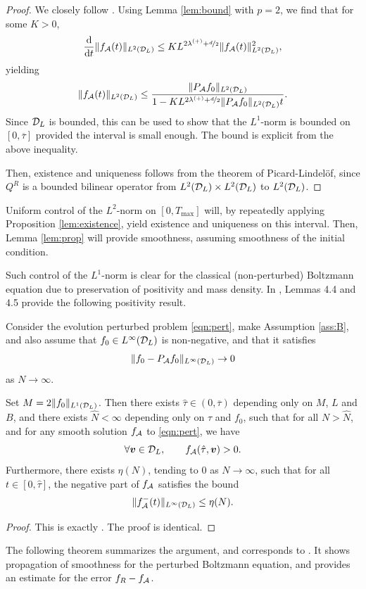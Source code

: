 \begin{proof}
  We closely follow \cite[Proposition 4.3]{Filbet11}. Using Lemma
  \ref{lem:bound} with $p=2$, we find that for some $K>0$,
  $$
  \frac{\mathrm{d}}{\mathrm{d} t}\|f_{\mathcal{A}}(t)\|_{L^2(\mathcal{D}_L)} \le
  KL^{2\lambda^{(+)}+\nicefrac{d}{2}}\|f_{\mathcal{A}}(t)\|_{L^2(\mathcal{D}_L)}^2,
  $$
  yielding
  $$
  \|f_{\mathcal{A}}(t)\|_{L^2(\mathcal{D}_L)} \leq \frac{\|P_{\mathcal{A}} f_0\|_{L^2(\mathcal{D}_L)}}
  {1-KL^{2\lambda^{(+)}+\nicefrac{d}{2}}\|P_{\mathcal{A}} f_0\|_{L^2(\mathcal{D}_L)}t}.
  $$
  Since $\mathcal{D}_L$ is bounded, this can be used to show that the $L^1$-norm is
  bounded on $[0,\overline{\tau}]$ provided the interval is small enough. The
  bound is explicit from the above inequality.
  
  Then, existence and uniqueness follows from the theorem of Picard-Lindelöf,
  since $Q^R$ is a bounded bilinear operator from $L^2(\mathcal{D}_L)\times L^2(\mathcal{D}_L)$ to
  $L^2(\mathcal{D}_L)$.
\end{proof}

Uniform control of the $L^2$-norm on $[0,T_\mathrm{max}]$ will, by repeatedly
applying Proposition \ref{lem:existence}, yield existence and uniqueness on
this interval. Then, Lemma \ref{lem:prop} will provide smoothness, assuming
smoothness of the initial condition.

Such control of the $L^1$-norm is clear for the classical (non-perturbed)
Boltzmann equation due to preservation of positivity and mass density. In
\cite{Filbet11}, Lemmas 4.4 and 4.5 provide the following positivity result.
\begin{lemma} \label{lem:positivity}
    Consider the evolution perturbed problem \eqref{eqn:pert}, make Assumption \ref{ass:B},
    and also assume that $f_0\in L^\infty(\mathcal{D}_L)$ is non-negative, and that it
    satisfies
    $$
        \|f_0-P_{\mathcal{A}} f_0\|_{L^\infty(\mathcal{D}_L)} \to 0
    $$
    as $N\to\infty$.

    Set $M=2\|f_0\|_{L^1(\mathcal{D}_L)}$. Then there exists $\hat{\tau} \in
    (0,\overline{\tau})$ depending only on $M$, $L$ and $B$, and there exists
    $\hat{N}<\infty$ depending only on $\hat{\tau}$ and $f_0$, such that for
    all $N > \hat{N}$, and for any smooth solution $f_{\mathcal{A}}$ to \eqref{eqn:pert},
    we have
    $$
        \forall {\bm v}\in\mathcal{D}_L, \qquad f_{\mathcal{A}}(\hat{\tau},{\bm v}) > 0.
    $$
    Furthermore, there exists $\eta(N)$, tending to $0$ as $N\to\infty$, such
    that for all $t\in[0,\hat{\tau}]$, the negative part of $f_{\mathcal{A}}$ satisfies
    the bound
    $$
        \|f_{\mathcal{A}}^{-}(t)\|_{L^\infty(\mathcal{D}_L)} \leq \eta(N).
    $$
\end{lemma}
\begin{proof}
    This is exactly \cite[Lemma 4.5]{Filbet11}. The proof is identical.
\end{proof}
The following theorem summarizes the argument, and corresponds to 
\cite[Proposition 4.6]{Filbet11}. It shows propagation of smoothness for the
perturbed Boltzmann equation, and provides an estimate for the error $f_R-f_{\mathcal{A}}$.

